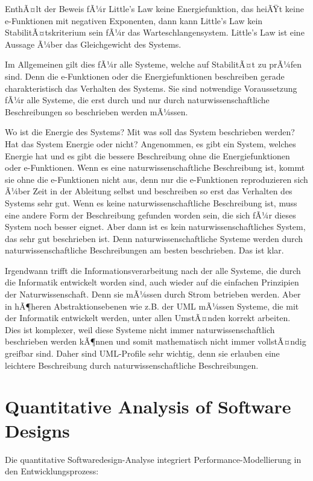 ﻿\documentclass[a4paper,12pt]{report}
\theoremstyle{definition}
\begin{document}
EnthÃ¤lt der Beweis fÃ¼r Little's Law keine Energiefunktion, das heiÃŸt keine e-Funktionen mit negativen Exponenten, dann kann Little's Law kein StabilitÃ¤tskriterium sein fÃ¼r das Warteschlangensystem. Little's Law ist eine Aussage Ã¼ber das Gleichgewicht des Systems.

Im Allgemeinen gilt dies fÃ¼r alle Systeme, welche auf StabilitÃ¤t zu prÃ¼fen sind. Denn die e-Funktionen oder die Energiefunktionen beschreiben gerade charakteristisch das Verhalten des Systems. Sie sind notwendige Voraussetzung fÃ¼r alle Systeme, die erst durch und nur durch naturwissenschaftliche Beschreibungen so beschrieben werden mÃ¼ssen.

Wo ist die Energie des Systems? Mit was soll das System beschrieben werden? Hat das System Energie oder nicht? Angenommen, es gibt ein System, welches Energie hat und es gibt die bessere Beschreibung ohne die Energiefunktionen oder e-Funktionen. Wenn es eine naturwissenschaftliche Beschreibung ist, kommt sie ohne die e-Funktionen nicht aus, denn nur die e-Funktionen reproduzieren sich Ã¼ber Zeit in der Ableitung selbst und beschreiben so erst das Verhalten des Systems sehr gut. Wenn es keine naturwissenschaftliche Beschreibung ist, muss eine andere Form der Beschreibung gefunden worden sein, die sich fÃ¼r dieses System noch besser eignet. Aber dann ist es kein naturwissenschaftliches System, das sehr gut beschrieben ist. Denn naturwissenschaftliche Systeme werden durch naturwissenschaftliche Beschreibungen am besten beschrieben. Das ist klar.

Irgendwann trifft die Informationsverarbeitung nach der alle Systeme, die durch die Informatik entwickelt worden sind, auch wieder auf die einfachen Prinzipien der Naturwissenschaft. Denn sie mÃ¼ssen durch Strom betrieben werden. Aber in hÃ¶heren Abstraktionsebenen wie z.B. der UML mÃ¼ssen Systeme, die mit der Informatik entwickelt werden, unter allen UmstÃ¤nden korrekt arbeiten. Dies ist komplexer, weil diese Systeme nicht immer naturwissenschaftlich beschrieben werden kÃ¶nnen und somit mathematisch nicht immer vollstÃ¤ndig greifbar sind. Daher sind UML-Profile sehr wichtig, denn sie erlauben eine leichtere Beschreibung durch naturwissenschaftliche Beschreibungen.

\section{Quantitative Analysis of Software Designs}

Die quantitative Softwaredesign-Analyse \cite{smith1990} integriert Performance-Modellierung in den Entwicklungsprozess:
\end{document}
